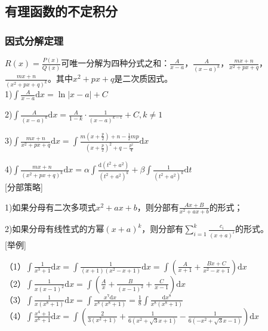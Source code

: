 \documentclass{SCIS2020cn}
\begin{document}
\subsection{有理函数的不定积分}
\subsubsection{因式分解定理}

$\displaystyle{}R(x)=\frac{P(x)}{Q(x)}$可唯一分解为四种分式之和：$\displaystyle\frac{A}{x-a}$，$\displaystyle\frac{A}{(x-a)^k}$，$\displaystyle\frac{mx+n}{x^2+px+q}$，$\displaystyle\frac{mx+n}{(x^2+px+q)^k}$。其中$x^2+px+q$是二次质因式。\\

1)$\displaystyle\int{\frac{A}{x-a}\text{d}x}=\ln{|x-a|}+C$

2)$\displaystyle\int{\frac{A}{(x-a)^k}\text{d}x}=\frac{A}{1-k}·\frac{1}{(x-a)^{k-1}}+C,k\neq1$

3)$\displaystyle\int{\frac{mx+n}{x^2+px+q}\text{d}x}=\int{\frac{m\left(x+\frac{p}{2}\right)+n-\frac{1}{2}mp}{\left(x+\frac{p}{2}\right)^2+q-\frac{p^2}{4}}\text{d}x}$

4)$\displaystyle\int{\frac{mx+n}{(x^2+px+q)^k}\text{d}x}=\alpha\int{\frac{\text{d}(t^2+a^2)}{(t^2+a^2)^k}}+\beta\int\frac{1}{(t^2+a^2)^k}\text{d}t$\\

[分部策略]

1)如果分母有二次多项式$x^2+ax+b$，则分部有$\displaystyle\frac{Ax+B}{x^2+ax+b}$的形式；

2)如果分母有线性式的方幂$(x+a)^k$，则分部有$\displaystyle\sum_{i=1}^k\frac{c_i}{(x+a)^i}$的形式。\\

[举例]

（1）$\displaystyle\int{\frac{1}{x^3+1}\text{d}x}=\int{\frac{1}{(x+1)(x^2-x+1)}\text{d}x}=\int{\left(\frac{A}{x+1}+\frac{Bx+C}{x^2-x+1}\right)\text{d}x}$\\

（2）$\displaystyle\int{\frac{1}{x(x-1)^2}\text{d}x}=\int{\left(\frac{A}{x}+\frac{B}{(x-1)^2}+\frac{C}{x-1}\right)\text{d}x}$\\

（3）$\displaystyle\int{\frac{1}{x(x^8+1)}\text{d}x}=\int{\frac{x^7\text{d}x}{x^8(x^8+1)}}=\frac{1}{8}\int{\frac{\text{d}x^8}{x^8(x^8+1)}}$\\

（4）$\displaystyle\int{\frac{x^4+1}{x^6+1}}\text{d}x=\int{\left(\frac{2}{3(x^2+1)}+\frac{1}{6(x^2+\sqrt{3}x+1)}-\frac{1}{6(-x^2+\sqrt{3}x-1)}\right)\text{d}x}$\\
\end{document}
